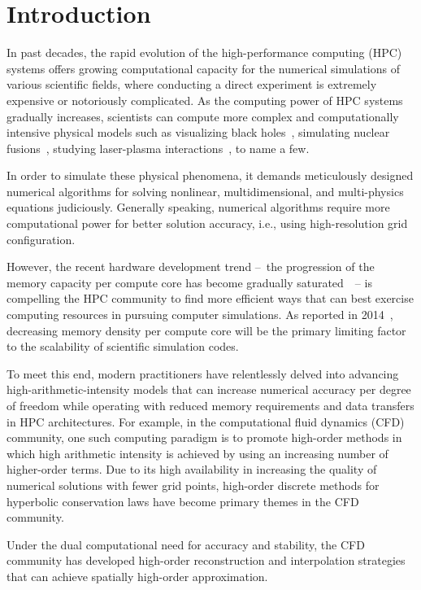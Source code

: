 \chapter{Introduction}\label{chap:introduction}

In past decades, the rapid evolution of the high-performance computing (HPC) systems
offers growing computational capacity for the numerical simulations of various scientific fields,
where conducting a direct experiment is extremely expensive or notoriously complicated.
As the computing power of HPC systems gradually increases,
scientists can compute more complex and computationally intensive physical models such as
visualizing black holes~\cite{james2015gravitational,alberdi2019first},
simulating nuclear fusions~\cite{haines2016detailed,gaffney2019making},
studying laser-plasma interactions~\cite{meinecke2014turbulent,tzeferacos2018laboratory},
to name a few.

In order to simulate these physical phenomena,
it demands meticulously designed numerical algorithms for solving
nonlinear, multidimensional, and multi-physics equations judiciously.
Generally speaking, numerical algorithms require more computational power for better solution accuracy,
i.e., using high-resolution grid configuration.

However, the recent hardware development trend
--~the progression of the memory capacity per compute core has become gradually saturated~\cite{attig2011trends}~--
is compelling the HPC community to find more efficient ways
that can best exercise computing resources in pursuing computer simulations.
As reported in 2014~\cite{dongarra2014applied}, decreasing memory density per compute core
will be the primary limiting factor to the scalability of scientific simulation codes.

To meet this end, modern practitioners have relentlessly delved into advancing
high-arithmetic-intensity models that can increase numerical accuracy per degree of freedom
while operating with reduced memory requirements and data transfers in HPC architectures.
For example, in the computational fluid dynamics (CFD) community,
one such computing paradigm is to promote high-order methods in which high arithmetic intensity is achieved
by using an increasing number of higher-order terms.
Due to its high availability in increasing the quality of numerical solutions with fewer grid points,
high-order discrete methods for hyperbolic conservation laws have become primary themes in the CFD community.

Under the dual computational need for accuracy and stability,
the CFD community has developed high-order reconstruction and interpolation strategies
that can achieve spatially high-order
approximation.~\cite{woodward1984numerical,colella1984piecewise,liu1994weighted,jiang1996efficient,borges2008improved,castro2011high,mignone2010high,balsara2016efficient}

